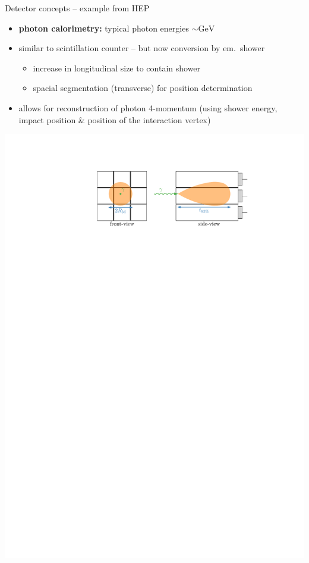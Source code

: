 \documentclass[11pt,xcolor=dvipsnames,professionalfonts]{beamer}
\begin{document}
\begin{frame}{Detector concepts -- example from HEP}
	\begin{itemize}
		\setlength\itemsep{1em}
		\item \textbf{photon calorimetry:} typical photon energies $\sim \mathrm{GeV}$
		
		\item similar to scintillation counter -- but now conversion by em.\ shower
		\begin{itemize}
			\item increase in longitudinal size to contain shower
			\item spacial segmentation (transverse) for position determination
		\end{itemize}
		
		\item allows for reconstruction of photon 4-momentum (using shower energy, impact position \& position of the interaction vertex)

	\end{itemize}
	\vfill
	\begin{center}
		\includegraphics{./figures/calorimeter.pdf}
	\end{center}
\end{frame}
\end{document}
